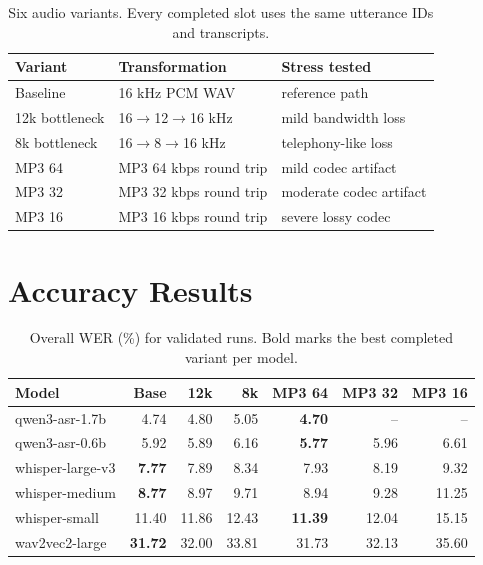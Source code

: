 \documentclass[11pt]{article}
\begin{document}
\begin{table}[t]
\centering
\scriptsize
\begin{tabular}{@{}lll@{}}
\toprule
Variant & Transformation & Stress tested \\
\midrule
Baseline & 16 kHz PCM WAV & reference path \\
12k bottleneck & 16$\rightarrow$12$\rightarrow$16 kHz & mild bandwidth loss \\
8k bottleneck & 16$\rightarrow$8$\rightarrow$16 kHz & telephony-like loss \\
MP3 64 & MP3 64 kbps round trip & mild codec artifact \\
MP3 32 & MP3 32 kbps round trip & moderate codec artifact \\
MP3 16 & MP3 16 kbps round trip & severe lossy codec \\
\bottomrule
\end{tabular}
\caption{Six audio variants. Every completed slot uses the same utterance IDs and transcripts.}
\label{tab:variants}
\end{table}

\section{Accuracy Results}

\begin{table}[t]
\centering
\scriptsize
\begin{tabular}{@{}lrrrrrr@{}}
\toprule
Model & Base & 12k & 8k & MP3 64 & MP3 32 & MP3 16 \\
\midrule
qwen3-asr-1.7b & 4.74 & 4.80 & 5.05 & \textbf{4.70} & -- & -- \\
qwen3-asr-0.6b & 5.92 & 5.89 & 6.16 & \textbf{5.77} & 5.96 & 6.61 \\
whisper-large-v3 & \textbf{7.77} & 7.89 & 8.34 & 7.93 & 8.19 & 9.32 \\
whisper-medium & \textbf{8.77} & 8.97 & 9.71 & 8.94 & 9.28 & 11.25 \\
whisper-small & 11.40 & 11.86 & 12.43 & \textbf{11.39} & 12.04 & 15.15 \\
wav2vec2-large & \textbf{31.72} & 32.00 & 33.81 & 31.73 & 32.13 & 35.60 \\
\bottomrule
\end{tabular}
\caption{Overall WER (\%) for validated runs. Bold marks the best completed variant per model.}
\label{tab:wer}
\end{table}
\end{document}
